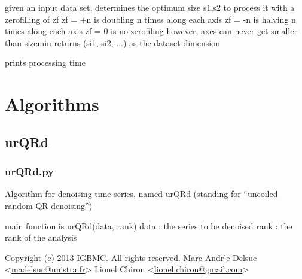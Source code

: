 \documentclass[letterpaper,10pt,openany,oneside]{sphinxmanual}
\begin{document}

\begin{fulllineitems}
\label{rst/code:processing.pred_sizes_zf}
given an input data set, determines the optimum size s1,s2 to process it with a zerofilling of zf
zf = +n is doubling n times along each axis
zf = -n is halving n times along each axis
zf = 0 is no zerofiling
however, axes can never get smaller than sizemin
returns (si1, si2, ...) as the dataset dimension

\end{fulllineitems}


\begin{fulllineitems}
\label{rst/code:processing.print_time}
prints processing time

\end{fulllineitems}



\section{Algorithms}
\label{rst/code:algorithms}

\subsection{urQRd}
\label{rst/code:urqrd}\label{rst/code:module-Algo.urQRd}

\subsubsection{urQRd.py}
\label{rst/code:urqrd-py}
Algorithm for denoising time series, named urQRd (standing for ``uncoiled random QR denoising'')

main function is 
urQRd(data, rank)
data : the series to be denoised
rank : the rank of the analysis

Copyright (c) 2013 IGBMC. All rights reserved.
Marc-Andr'e Delsuc \textless{}\href{mailto:madelsuc@unistra.fr}{madelsuc@unistra.fr}\textgreater{}
Lionel Chiron \textless{}\href{mailto:lionel.chiron@gmail.com}{lionel.chiron@gmail.com}\textgreater{}
\end{document}
